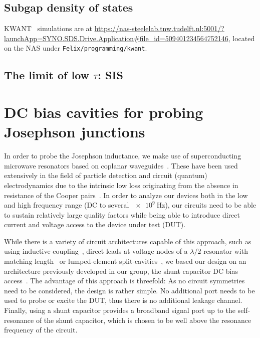 \subsection{Subgap density of states}

KWANT~\cite{grothKwantSoftwarePackage2014} simulations are at \url{https://nas-steelelab.tnw.tudelft.nl:5001/?launchApp=SYNO.SDS.Drive.Application#file_id=509401234564752146}, located on the NAS under \texttt{Felix/programming/kwant}.

\subsection{The limit of low $\tau$: SIS}



\section{DC bias cavities for probing Josephson junctions}



In order to probe the Josephson inductance, we make use of superconducting microwave resonators based on coplanar waveguides~\cite{gopplCoplanarWaveguideResonators2008,zmuidzinasSuperconductingMicroresonatorsPhysics2012}.
%
These have been used extensively in the field of particle detection and circuit (quantum) electrodynamics due to the intrinsic low loss originating from the absence in resistance of the Cooper pairs~\cite{dayBroadbandSuperconductingDetector2003a,blaisCavityQuantumElectrodynamics2004c}.
%
In order to analyze our devices both in the low and high frequency range (DC to several $\SI{e9}{\hertz}$), our circuits need to be able to sustain relatively large quality factors while being able to introduce direct current and voltage access to the device under test (DUT).

While there is a variety of circuit architectures capable of this approach, such as using inductive coupling~\cite{vissersFrequencytunableSuperconductingResonators2015b}, direct leads at voltage nodes of a $\lambda/2$ resonator with matching length~\cite{chenIntroductionDcBias2011a,liApplyingDirectCurrent2013} or lumped-element split-cavities~\cite{mahashabdeFastTunableHigh2020}, we based our design on an architecture previously developed in our group, the shunt capacitor DC bias access~\cite{bosmanBroadbandArchitectureGalvanically2015c}.
%
The advantage of this approach is threefold:
%
As no circuit symmetries need to be considered, the design is rather simple.
%
No additional port needs to be used to probe or excite the DUT, thus there is no additional leakage channel.
%
Finally, using a shunt capacitor provides a broadband signal port up to the self-resonance of the shunt capacitor, which is chosen to be well above the resonance frequency of the circuit.

